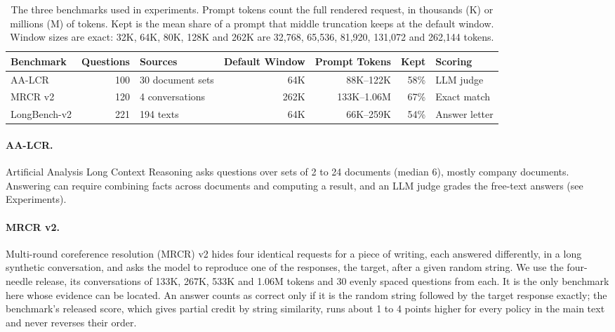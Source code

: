\documentclass[letterpaper]{article} %
\begin{document}
\begin{table}[t]
\centering
\small
\begin{tabular}{lrlrrrl}
\toprule
Benchmark & Questions & Sources & Default Window & Prompt Tokens & Kept & Scoring \\
\midrule
AA-LCR & 100 & 30 document sets & 64K & 88K--122K & 58\% & LLM judge \\
MRCR v2 & 120 & 4 conversations & 262K & 133K--1.06M & 67\% & Exact match \\
LongBench-v2 & 221 & 194 texts & 64K & 66K--259K & 54\% & Answer letter \\
\bottomrule
\end{tabular}
\caption{The three benchmarks used in experiments. Prompt tokens count the full rendered request, in thousands (K) or millions (M) of tokens. Kept is the mean share of a prompt that middle truncation keeps at the default window. Window sizes are exact: 32K, 64K, 80K, 128K and 262K are 32,768, 65,536, 81,920, 131,072 and 262,144 tokens.}
\label{tab:benchmarks}
\end{table}

\paragraph{AA-LCR.} Artificial Analysis Long Context Reasoning \cite{artificialanalysis2025aalcr} asks questions over sets of 2 to 24 documents (median 6), mostly company documents. Answering can require combining facts across documents and computing a result, and an LLM judge grades the free-text answers (see Experiments).

\paragraph{MRCR v2.} Multi-round coreference resolution (MRCR) v2 \cite{vodrahalli2024michelangelo} hides four identical requests for a piece of writing, each answered differently, in a long synthetic conversation, and asks the model to reproduce one of the responses, the target, after a given random string. We use the four-needle release, its conversations of 133K, 267K, 533K and 1.06M tokens and 30 evenly spaced questions from each. It is the only benchmark here whose evidence can be located. An answer counts as correct only if it is the random string followed by the target response exactly; the benchmark's released score, which gives partial credit by string similarity, runs about 1 to 4 points higher for every policy in the main text and never reverses their order.
\end{document}
